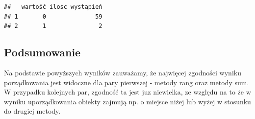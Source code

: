 \documentclass[12pt,a4paper]{report}
\begin{document}
{\begin{verbatim}
##   wartość ilosc wystąpień
## 1       0              59
## 2       1               2
\end{verbatim}

\subsection{Podsumowanie}\label{podsumowanie}

Na podstawie powyższych wyników zauważamy, że najwięcej zgodności wyniku
porządkowania jest widoczne dla pary pierwszej - metody rang oraz metody
sum. W przypadku kolejnych par, zgodność ta jest juz niewielka, ze
względu na to że w wyniku uporządkowania obiekty zajmują np. o miejsce
niżej lub wyżej w stosunku do drugiej metody.




}










\end{document}

